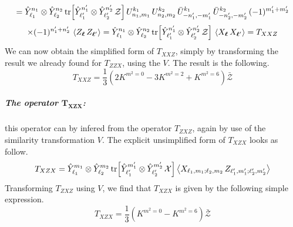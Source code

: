%
%
\begin{equation*}
=
\hat{Y}_{\ell_1}^{n_1} \otimes \hat{Y}_{\ell_2}^{n_2}
\tr[\hat{Y}_{\ell_1'}^{n_1'} \otimes \hat{Y}_{\ell_2'}^{n_2'} \, \mathcal{Z}] \,
U^{k_1}_{n_1,m_1} \, U^{k_2}_{n_2,m_2} \,
\bar{U}^{k_1}_{-n_1',-m_1'} \, \bar{U}^{k_2}_{-n_2',-m_2'} \,
(-1)^{m_1' + m_2'}
\end{equation*}
%
%
\begin{equation}
\times
(-1)^{n_1' + n_2'} \,
\expval{Z_{\boldsymbol{\ell}} \, Z_{\boldsymbol{\ell}'}}
=
\hat{Y}_{\ell_1}^{n_1} \otimes \hat{Y}_{\ell_2}^{n_2}
\tr[\hat{Y}_{\ell_1'}^{n_1'} \otimes \hat{Y}_{\ell_2'}^{n_2'} \, \mathcal{Z}] \,
\expval{X_{\boldsymbol{\ell}} \, X_{\boldsymbol{\ell}'}}
=
T_{XXZ}
\end{equation}
%
%
We can now obtain the simplified form of $T_{XXZ}$, simply by transforming the result we already found for $T_{ZZX}$, using the $V$. The result is the following.
%
%
\begin{equation}
T_{XXZ} = \frac{1}{3}
\left(
2 K^{m^2 = 0}
- 3 K^{m^2 = 2}
+ K^{m^2 = 6}
\right)
\bar{\mathcal{Z}}
\end{equation}
%
%

\subparagraph[The operator $T_{XZX}$]{The operator $\mathbf{T_{XZX}}$:} this operator can by infered from the operator $T_{ZXZ}$, again by use of the similarity transformation $V$. The explicit unsimplified form of $T_{XZX}$ looks as follow.
%
%
\begin{equation}
T_{XZX} = \hat{Y}_{\ell_1}^{m_1} \otimes \hat{Y}_{\ell_2}^{m_2}
\tr[\hat{Y}_{\ell_1'}^{m_1'} \otimes \hat{Y}_{\ell_2'}^{m_2'} \, \mathcal{X}]
\expval{X_{\ell_1, m_1; \ell_2, m_2} \, Z_{\ell_1', m_1'; \ell_2', m_2'}}
\end{equation}
%
%
Transforming $T_{ZXZ}$ using $V$, we find that $T_{XZX}$ is given by the following simple expression.
%
%
\begin{equation}
T_{XZX} = \frac{1}{3} \left(
K^{m^2=0} - K^{m^2=6}
\right)
\bar{\mathcal{Z}}
\end{equation}
%
%

